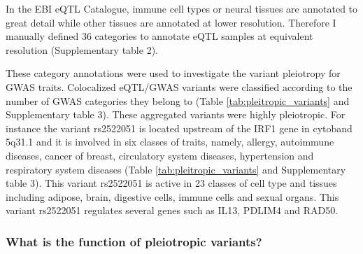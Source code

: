 In the EBI eQTL Catalogue, immune cell types or neural tissues are annotated to great detail while other tissues are annotated at lower resolution.
%
Therefore I manually defined 36 categories to annotate eQTL samples at equivalent resolution (Supplementary table 2).

These category annotations were used to investigate the variant pleiotropy for GWAS traits.
%
Colocalized eQTL/GWAS variants were classified according to the number of GWAS categories they belong to (Table \ref{tab:pleitropic_variants} and Supplementary table 3).
%
These aggregated variants were highly pleiotropic.
%
For instance the variant rs2522051 is located upstream of the IRF1 gene in cytoband 5q31.1 and it is involved in six classes of traits, namely,
allergy, autoimmune diseases, cancer of breast, circulatory system diseases, hypertension and respiratory system diseases
(Table \ref{tab:pleitropic_variants} and Supplementary table 3).
%
This variant rs2522051 is active in 23 classes of cell type and tissues including adipose, brain, digestive cells, immune cells and sexual organs.
%
This variant rs2522051 regulates several genes such as IL13, PDLIM4 and RAD50.

\subsubsection*{What is the function of pleiotropic variants?}


